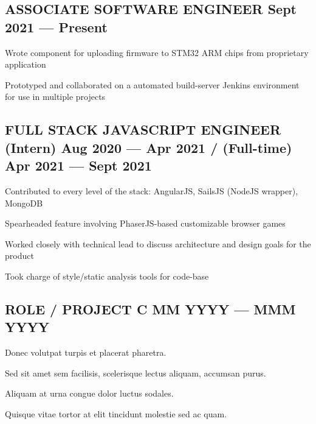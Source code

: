 \documentclass[letter,10pt]{article}
\begin{document}
\subsection{{ASSOCIATE SOFTWARE ENGINEER \texorpdfstring{\hfill}{\space} Sept 2021 --- Present}}
\begin{zitemize}
\item Wrote component for uploading firmware to STM32 ARM chips from proprietary application
\item Prototyped and collaborated on a automated build-server Jenkins environment for use in multiple projects
\end{zitemize}

\subsection{{FULL STACK JAVASCRIPT ENGINEER \texorpdfstring{\hfill}{\space} (Intern) Aug 2020 --- Apr 2021 / (Full-time) Apr 2021 --- Sept 2021}}
\begin{zitemize}
\item Contributed to every level of the stack: AngularJS, SailsJS (NodeJS wrapper), MongoDB
\item Spearheaded feature involving PhaserJS-based customizable browser games
\item Worked closely with technical lead to discuss architecture and design goals for the product
\item Took charge of style/static analysis tools for code-base
\end{zitemize}

\subsection{{ROLE / PROJECT C \texorpdfstring{\hfill}{\space} MM YYYY --- MMM YYYY}}
\begin{zitemize}
\item Donec volutpat turpis et placerat pharetra.
\item Sed sit amet sem facilisis, scelerisque lectus aliquam, accumsan purus.
\item Aliquam at urna congue dolor luctus sodales.
\item Quisque vitae tortor at elit tincidunt molestie sed ac quam.
\end{zitemize}
\end{document}
